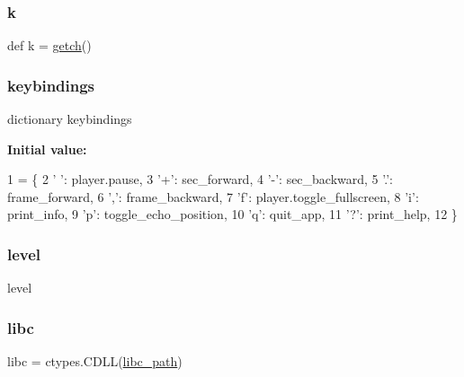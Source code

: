 \mbox{\label{namespacevlc_a1abc95f8cbff85a4001af40c469444e6}} 
\subsubsection{\texorpdfstring{k}{k}}
{\footnotesize\ttfamily def k = \hyperlink{namespacevlc_a26c66231b8919b9ec0736a57bab415b9}{getch}()}

\mbox{\label{namespacevlc_a3540c8e41ef509a65a719ad6b7e5261c}} 
\subsubsection{\texorpdfstring{keybindings}{keybindings}}
{\footnotesize\ttfamily dictionary keybindings}

{\bfseries Initial value\+:}
\begin{DoxyCode}
1 =  \{
2             \textcolor{stringliteral}{' '}: player.pause,
3             \textcolor{stringliteral}{'+'}: sec\_forward,
4             \textcolor{stringliteral}{'-'}: sec\_backward,
5             \textcolor{stringliteral}{'.'}: frame\_forward,
6             \textcolor{stringliteral}{','}: frame\_backward,
7             \textcolor{stringliteral}{'f'}: player.toggle\_fullscreen,
8             \textcolor{stringliteral}{'i'}: print\_info,
9             \textcolor{stringliteral}{'p'}: toggle\_echo\_position,
10             \textcolor{stringliteral}{'q'}: quit\_app,
11             \textcolor{stringliteral}{'?'}: print\_help,
12             \}
\end{DoxyCode}
\mbox{\label{namespacevlc_afde8e18a788ccc92fc61cab298bca7e3}} 
\subsubsection{\texorpdfstring{level}{level}}
{\footnotesize\ttfamily level}

\mbox{\label{namespacevlc_a23b02f3fc0fc2663e64b4d51b19ebb56}} 
\subsubsection{\texorpdfstring{libc}{libc}}
{\footnotesize\ttfamily libc = ctypes.\+C\+D\+LL(\hyperlink{namespacevlc_a7469cfb80443db78c5bf2aaea5ba2f15}{libc\+\_\+path})}

